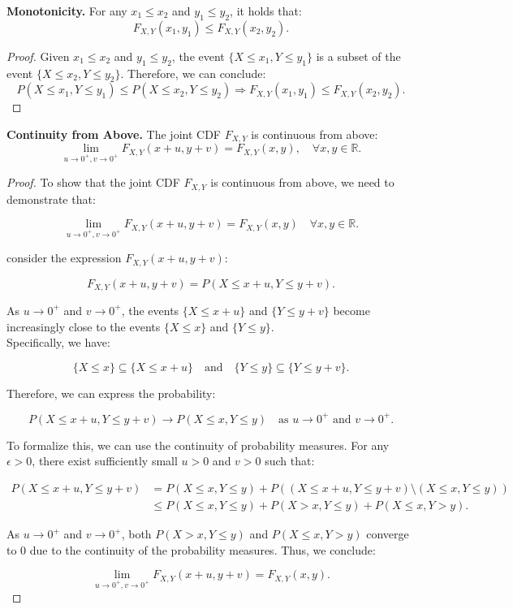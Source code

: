\begin{lemma}
    \textbf{Monotonicity.} For any \( x_1 \leq x_2 \) and \( y_1 \leq y_2 \), it holds that:
    \[
    F_{X,Y}(x_1, y_1) \leq F_{X,Y}(x_2, y_2).
    \]
\end{lemma}

\begin{proof}
    Given \( x_1 \leq x_2 \) and \( y_1 \leq y_2 \), the event \( \{X \leq x_1, Y \leq y_1\} \) is a subset of the event \( \{X \leq x_2, Y \leq y_2\} \). Therefore, we can conclude:
   \[
   P(X \leq x_1, Y \leq y_1) \leq P(X \leq x_2, Y \leq y_2) \Rightarrow F_{X,Y}(x_1, y_1) \leq F_{X,Y}(x_2, y_2).
   \]
\end{proof}

\begin{lemma}
    \textbf{Continuity from Above.}  The joint CDF \( F_{X,Y} \) is continuous from above:
    \[
    \lim_{u \to 0^+, v \to 0^+} F_{X,Y}(x+u, y+v) = F_{X,Y}(x,y), \quad \forall x,y \in \mathbb{R}.
    \]
\end{lemma}

\begin{proof}
    To show that the joint CDF \( F_{X,Y} \) is continuous from above, we need to demonstrate that:

\[
\lim_{u \to 0^+, v \to 0^+} F_{X,Y}(x+u, y+v) = F_{X,Y}(x,y) \quad \forall x,y \in \mathbb{R}.
\]

consider the expression \( F_{X,Y}(x+u, y+v) \):

\[
F_{X,Y}(x+u, y+v) = P(X \leq x+u, Y \leq y+v).
\]

As \( u \to 0^+ \) and \( v \to 0^+ \), the events \( \{X \leq x+u\} \) and \( \{Y \leq y+v\} \) become increasingly close to the events \( \{X \leq x\} \) and \( \{Y \leq y\} \). \\

Specifically, we have:

\[
\{X \leq x\} \subseteq \{X \leq x+u\} \quad \text{and} \quad \{Y \leq y\} \subseteq \{Y \leq y+v\}.
\]

Therefore, we can express the probability:

\[
P(X \leq x+u, Y \leq y+v) \to P(X \leq x, Y \leq y) \quad \text{as } u \to 0^+ \text{ and } v \to 0^+.
\]

To formalize this, we can use the continuity of probability measures. For any \( \epsilon > 0 \), there exist sufficiently small \( u > 0 \) and \( v > 0 \) such that:

\[
\begin{aligned}
P(X \leq x+u, Y \leq y+v) &= P(X \leq x, Y \leq y) + P((X \leq x+u, Y \leq y+v) \setminus (X \leq x, Y \leq y)) \\
&\leq P(X \leq x, Y \leq y) + P(X > x, Y \leq y) + P(X \leq x, Y > y).
\end{aligned}
\]

As \( u \to 0^+ \) and \( v \to 0^+ \), both \( P(X > x, Y \leq y) \) and \( P(X \leq x, Y > y) \) converge to 0 due to the continuity of the probability measures. Thus, we conclude:

\[
\lim_{u \to 0^+, v \to 0^+} F_{X,Y}(x+u, y+v) = F_{X,Y}(x,y).
\]

\end{proof}

